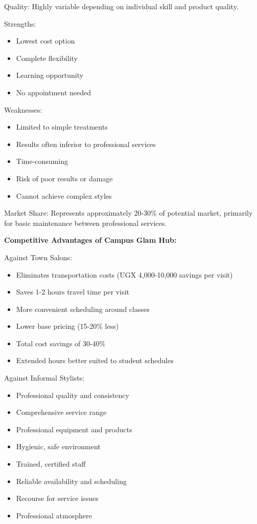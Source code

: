 Quality: Highly variable depending on individual skill and product quality.

Strengths:
\begin{itemize}[leftmargin=2em]
    \item Lowest cost option
    \item Complete flexibility
    \item Learning opportunity
    \item No appointment needed
\end{itemize}

Weaknesses:
\begin{itemize}[leftmargin=2em]
    \item Limited to simple treatments
    \item Results often inferior to professional services
    \item Time-consuming
    \item Risk of poor results or damage
    \item Cannot achieve complex styles
\end{itemize}

Market Share: Represents approximately 20-30\% of potential market, primarily for basic maintenance between professional services.

\textbf{Competitive Advantages of Campus Glam Hub:}

Against Town Salons:
\begin{itemize}[leftmargin=2em]
    \item Eliminates transportation costs (UGX 4,000-10,000 savings per visit)
    \item Saves 1-2 hours travel time per visit
    \item More convenient scheduling around classes
    \item Lower base pricing (15-20\% less)
    \item Total cost savings of 30-40\%
    \item Extended hours better suited to student schedules
\end{itemize}

Against Informal Stylists:
\begin{itemize}[leftmargin=2em]
    \item Professional quality and consistency
    \item Comprehensive service range
    \item Professional equipment and products
    \item Hygienic, safe environment
    \item Trained, certified staff
    \item Reliable availability and scheduling
    \item Recourse for service issues
    \item Professional atmosphere
\end{itemize}


